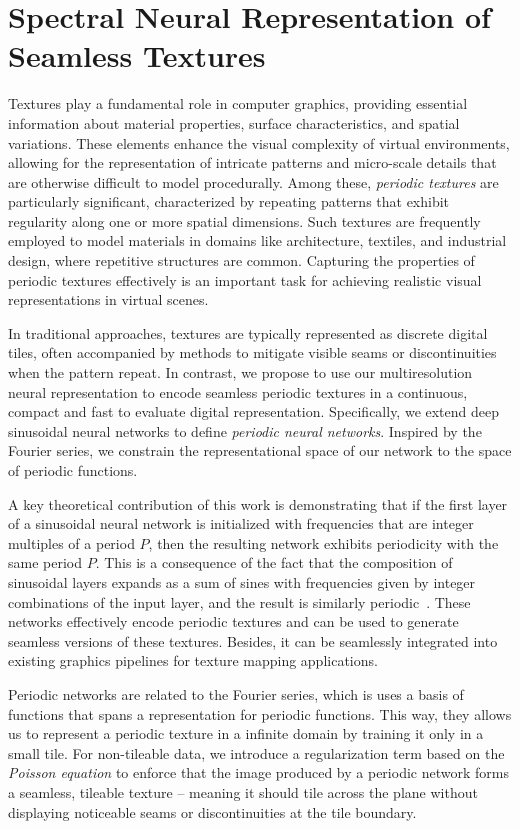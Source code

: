 \chapter{Spectral Neural Representation of Seamless Textures}
\label{chap:seamless-textures}

Textures play a fundamental role in computer graphics, providing essential information about material properties, surface characteristics, and spatial variations. These elements enhance the visual complexity of virtual environments, allowing for the representation of intricate patterns and micro-scale details that are otherwise difficult to model procedurally. Among these, \textit{periodic textures} are particularly significant, characterized by repeating patterns that exhibit regularity along one or more spatial dimensions. Such textures are frequently employed to model materials in domains like architecture, textiles, and industrial design, where repetitive structures are common. Capturing the properties of periodic textures effectively is an important task for achieving realistic visual representations in virtual scenes.

In traditional approaches, textures are typically represented as discrete digital tiles, often accompanied by methods to mitigate visible seams or discontinuities when the pattern repeat. In contrast, we propose to use our multiresolution neural representation to encode seamless periodic textures in a continuous, compact and fast to evaluate digital representation. Specifically, we extend deep sinusoidal neural networks to define \textit{periodic neural networks}. Inspired by the Fourier series, we constrain the representational space of our network to the space of periodic functions.

A key theoretical contribution of this work is demonstrating that if the first layer of a sinusoidal neural network is initialized with frequencies that are integer multiples of a period $P$, then the resulting network exhibits periodicity with the same period $P$. This is a consequence of the fact that the composition of sinusoidal layers expands as a sum of sines with frequencies given by integer combinations of the input layer, and the result is similarly periodic~\citep{novello2022understanding, yuce2022structured}. These networks effectively encode periodic textures and can be used to generate seamless versions of these textures. Besides, it can be seamlessly integrated into existing graphics pipelines for texture mapping applications.

Periodic networks are related to the Fourier series, which is uses a basis of functions that spans a representation for periodic functions. This way, they allows us to represent a periodic texture in a infinite domain by training it only in a small tile. For non-tileable data, we introduce a regularization term based on the \textit{Poisson equation} to enforce that the image produced by a periodic network forms a seamless, tileable texture -- meaning it should tile across the plane without displaying noticeable seams or discontinuities at the tile boundary. 

